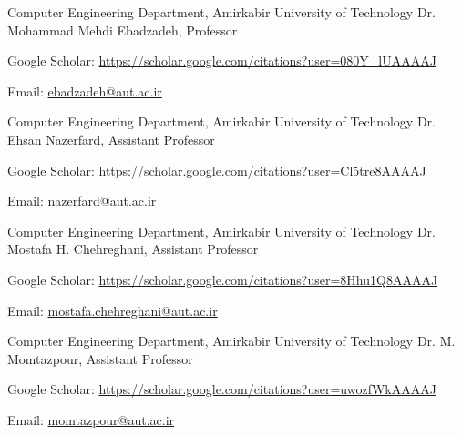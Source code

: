 \begin{cventries}
  \cventry
    {Computer Engineering Department, Amirkabir University of Technology} %
    {Dr. Mohammad Mehdi Ebadzadeh, Professor} %
    {} %
    {} %
    {
      \begin{cvitems} %
        \item {Google Scholar: \href{https://scholar.google.com/citations?user=080Y\_lUAAAAJ&hl=en}{https://scholar.google.com/citations?user=080Y\_lUAAAAJ}}
        \item {Email: \href{mailto:ebadzadeh@aut.ac.ir}{ebadzadeh@aut.ac.ir}}
      \end{cvitems}
    }

  \cventry
    {Computer Engineering Department, Amirkabir University of Technology} %
    {Dr. Ehsan Nazerfard, Assistant Professor} %
    {} %
    {} %
    {
      \begin{cvitems} %
        \item {Google Scholar: \href{https://scholar.google.com/citations?user=Cl5tre8AAAAJ&hl=en}{https://scholar.google.com/citations?user=Cl5tre8AAAAJ}}
        \item {Email: \href{mailto:nazerfard@aut.ac.ir}{nazerfard@aut.ac.ir}}
      \end{cvitems}
    }

  \cventry
    {Computer Engineering Department, Amirkabir University of Technology} %
    {Dr. Mostafa H. Chehreghani, Assistant Professor} %
    {} %
    {} %
    {
      \begin{cvitems} %
        \item {Google Scholar: \href{https://scholar.google.com/citations?user=8Hhu1Q8AAAAJ&hl=en}{https://scholar.google.com/citations?user=8Hhu1Q8AAAAJ}}
        \item {Email: \href{mailto:mostafa.chehreghani@aut.ac.ir}{mostafa.chehreghani@aut.ac.ir}}
      \end{cvitems}
    }

  \cventry
    {Computer Engineering Department, Amirkabir University of Technology} %
    {Dr. M. Momtazpour, Assistant Professor} %
    {} %
    {} %
    {
      \begin{cvitems} %
        \item {Google Scholar: \href{https://scholar.google.com/citations?user=uwozfWkAAAAJ&hl=en}{https://scholar.google.com/citations?user=uwozfWkAAAAJ}}
        \item {Email: \href{mailto:momtazpour@aut.ac.ir}{momtazpour@aut.ac.ir}}
      \end{cvitems}
    }


\end{cventries}
